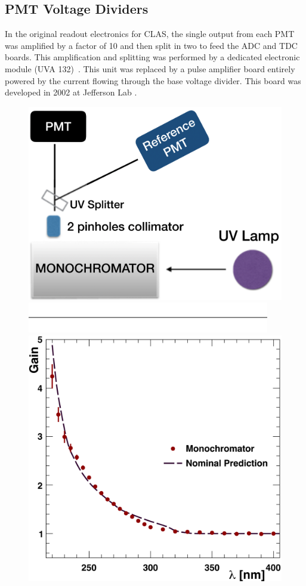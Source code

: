 \subsection{PMT Voltage Dividers}\label{sec:dividers}

In the original readout electronics for CLAS, the single output from each PMT was amplified by a factor of 10 and then
split in two to feed the ADC and TDC boards. This amplification and splitting was performed by a dedicated electronic
module (UVA 132)~\cite{Adams:2001kk}. This unit was replaced by a pulse amplifier board entirely powered by the
current flowing through the base voltage divider. This board was developed in 2002 at Jefferson Lab
\cite{Popov:2003mj}.

\begin{figure}[H]
	\centering
	\includegraphics[width=0.99\columnwidth, height=0.65\columnwidth]{img/pmtTestingSetup.png}
	\includegraphics[width=0.99\columnwidth, keepaspectratio]{img/blank.png}
	\includegraphics[width=0.99\columnwidth, keepaspectratio]{img/ptQEResults.png}

\end{figure}
